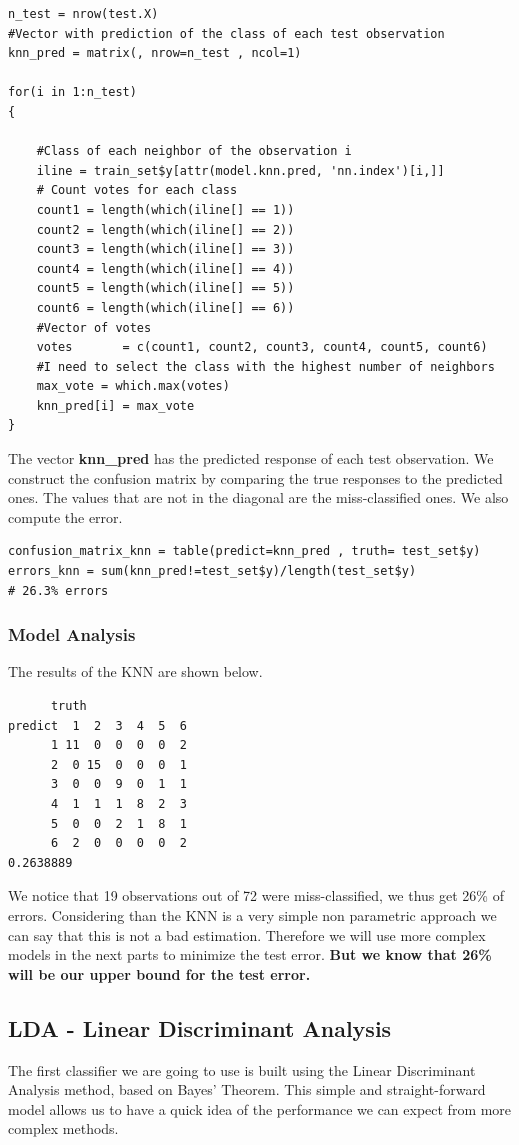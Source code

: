 \documentclass[]{report}
\begin{document}
\begin{lstlisting}
n_test = nrow(test.X)
#Vector with prediction of the class of each test observation
knn_pred = matrix(, nrow=n_test , ncol=1) 

for(i in 1:n_test)
{

    #Class of each neighbor of the observation i
    iline = train_set$y[attr(model.knn.pred, 'nn.index')[i,]]
    # Count votes for each class
    count1 = length(which(iline[] == 1)) 
    count2 = length(which(iline[] == 2)) 
    count3 = length(which(iline[] == 3)) 
    count4 = length(which(iline[] == 4)) 
    count5 = length(which(iline[] == 5)) 
    count6 = length(which(iline[] == 6)) 
    #Vector of votes
    votes       = c(count1, count2, count3, count4, count5, count6)
    #I need to select the class with the highest number of neighbors
    max_vote = which.max(votes)
    knn_pred[i] = max_vote
}
\end{lstlisting}
The vector \textbf{knn\_pred} has the predicted response of each test observation. We construct the confusion matrix by comparing the true responses to the predicted ones. The values that are not in the diagonal are the miss-classified ones. We also compute the error.
\begin{lstlisting}
confusion_matrix_knn = table(predict=knn_pred , truth= test_set$y)
errors_knn = sum(knn_pred!=test_set$y)/length(test_set$y)
# 26.3% errors
\end{lstlisting}
\pagebreak
\subsubsection{Model Analysis}
The results of the KNN are shown below.
\begin{verbatim}
      truth
predict  1  2  3  4  5  6
      1 11  0  0  0  0  2
      2  0 15  0  0  0  1
      3  0  0  9  0  1  1
      4  1  1  1  8  2  3
      5  0  0  2  1  8  1
      6  2  0  0  0  0  2
0.2638889
\end{verbatim}
We notice that 19 observations out of 72 were miss-classified, we thus get 26\% of errors. Considering than the KNN is a very simple non parametric approach we can say that this is not a bad estimation. Therefore we will use more complex models in the next parts to minimize the test error. \textbf{But we know that 26\% will be our upper bound for the test error.}

\pagebreak

\subsection{LDA - Linear Discriminant Analysis}
The first classifier we are going to use is built using the Linear Discriminant Analysis method, based on Bayes' Theorem. This simple and straight-forward model allows us to have a quick idea of the performance we can expect from more complex methods.  
\end{document}
